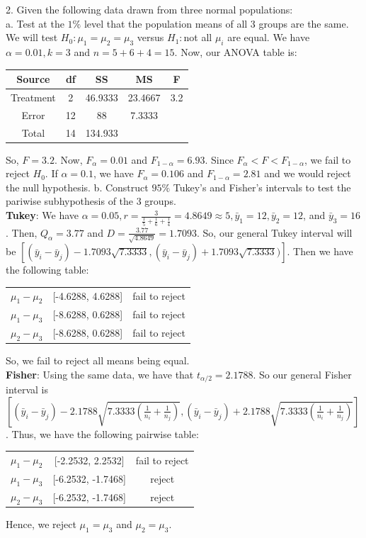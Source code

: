 \documentclass[12pt]{article}
\begin{document}
2.  Given the following data drawn from three normal populations:\\
a. Test at the $1\%$ level that the population means of all 3 groups are the same.\\
We will test $H_0:\mu_1=\mu_2=\mu_3$ versus $H_1:$not all $\mu_i$ are equal. We have $\alpha=0.01, k=3$ and $n=5+6+4=15$. Now, our ANOVA table is:
\begin{center}
\begin{tabular}{ c|   c   c   c   c  }
Source & df & SS & MS & F\\
\hline
Treatment & 2 & 46.9333 & 23.4667 & 3.2\\
Error & 12 & 88 & 7.3333 & \\
Total & 14 & 134.933 &  & 
\end{tabular}
\end{center}
So, $F=3.2$. Now, $F_{\alpha}=0.01$ and $F_{1-\alpha}=6.93$. Since $F_{\alpha}<F<F_{1-\alpha}$, we fail to reject $H_0$. If $\alpha=0.1$, we have $F_{\alpha}=0.106$ and $F_{1-\alpha}=2.81$ and we would reject the null hypothesis.
b. Construct $95\%$ Tukey's and Fisher's intervals to test the pariwise subhypothesis of the 3 groups.\\
\textbf{Tukey}: We have $\alpha=0.05, r=\frac{3}{\frac15+\frac16+\frac14}=4.8649\approx5, \bar{y}_1=12, \bar{y}_2=12$, and $\bar{y}_3=16$. Then, $Q_{\alpha}=3.77$ and $D=\frac{3.77}{\sqrt{4.8649}}=1.7093$. So, our general Tukey interval will be $[(\bar{y}_i-\bar{y}_j)-1.7093\sqrt{7.3333}, (\bar{y}_i-\bar{y}_j)+1.7093\sqrt{7.3333})]$. Then we have the following table:
\begin{center}
\begin{tabular}{ c   c   c  }
$\mu_1-\mu_2$ & [-4.6288, 4.6288] & fail to reject\\
$\mu_1-\mu_3$ & [-8.6288, 0.6288] & fail to reject\\
$\mu_2-\mu_3$ & [-8.6288, 0.6288] & fail to reject
\end{tabular}
\end{center}
So, we fail to reject all means being equal.\\
\textbf{Fisher}: Using the same data, we have that $t_{\alpha/2}=2.1788$. So our general Fisher interval is $[(\bar{y}_i-\bar{y}_j)-2.1788\sqrt{7.3333(\frac{1}{n_i}+\frac{1}{n_j})}, (\bar{y}_i-\bar{y}_j)+2.1788\sqrt{7.3333(\frac{1}{n_i}+\frac{1}{n_j})}]$. Thus, we have the following pairwise table:
\begin{center}
\begin{tabular}{ c   c   c  }
$\mu_1-\mu_2$ & [-2.2532, 2.2532] & fail to reject\\
$\mu_1-\mu_3$ & [-6.2532, -1.7468] & reject\\
$\mu_2-\mu_3$ & [-6.2532, -1.7468] & reject
\end{tabular}
\end{center}
Hence, we reject $\mu_1=\mu_3$ and $\mu_2=\mu_3$.\\[20pt]
\end{document}
